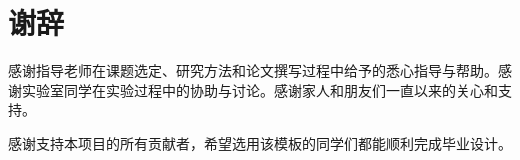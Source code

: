 \chapter*{谢\hspace{0.5em}辞}

感谢指导老师在课题选定、研究方法和论文撰写过程中给予的悉心指导与帮助。感谢实验室同学在实验过程中的协助与讨论。感谢家人和朋友们一直以来的关心和支持。

感谢支持本项目的所有贡献者，希望选用该模板的同学们都能顺利完成毕业设计。
